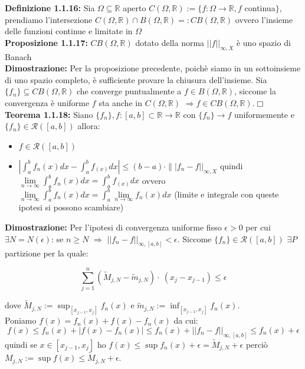 \documentclass[a4paper,11pt,titlepage]{book}
\begin{document}
\textbf{Definizione 1.1.16:} Sia $\Omega \subseteq \mathbb{R}$ aperto $C(\Omega,\mathbb{R}):=\{f:\Omega\rightarrow\mathbb{R}, f$ continua$\}$, prendiamo l'intersezione $C(\Omega,\mathbb{R})\cap B(\Omega,\mathbb{R})=:CB(\Omega,\mathbb{R})$ ovvero l'insieme delle funzioni continue e limitate in $\Omega$\\

\textbf{Proposizione 1.1.17:} $CB(\Omega,\mathbb{R})$ dotato della norma $||f||_{\infty,X}$ è uno spazio di Banach\\

\textbf{Dimostrazione:} Per la proposizione precedente, poichè siamo in un sottoinsieme di uno spazio completo, è sufficiente provare la chiusura dell'insieme. Sia $\{f_{n}\}\subseteq CB(\Omega,\mathbb{R})$ che converge puntualmente a $f\in B(\Omega,\mathbb{R})$, siccome la convergenza è uniforme $f$ sta anche in $C(\Omega,\mathbb{R})$ $\Rightarrow f \in CB(\Omega,\mathbb{R})$.$\Box$\\

\textbf{Teorema 1.1.18:} Siano $\{f_{n}\},f:[a,b]\subset\mathbb{R}\rightarrow\mathbb{R}$ con $\{f_{n}\}\rightarrow f$ uniformemente e  $\{f_{n}\}\in\mathcal{R}([a,b])$ allora:
\begin{itemize}
\item $f\in \mathcal{R}([a,b])$
\item $|\int_{a}^{b}f_{n}(x)dx-\int_{a}^{b}f_(x)dx|\leq (b-a)\cdot\||f_{n}-f||_{\infty,X}$ quindi $\lim\limits_{n \to \infty}\int_{a}^{b}f_{n}(x)dx=\int_{a}^{b}f_(x)dx$ ovvero $\lim\limits_{n \to \infty}\int_{a}^{b}f_{n}(x)dx=\int_{a}^{b}\lim\limits_{n \to \infty}{f_{n}(x)}dx$ (limite e integrale con queste ipotesi si possono scambiare) \\
\end{itemize}

\textbf{Dimostrazione:} Per l'ipotesi di convergenza uniforme fisso $\epsilon >0$ per cui $\exists{N}=N(\epsilon)$: se $n\geq{N}$ $\Rightarrow$ $||f_{n}-f||_{\infty,[a,b]}<\epsilon$. Siccome $\{f_{n}\}\in\mathcal{R}([a,b])$ $\exists P$ partizione per la quale:


 $$\sum_{j=1}^n (\widetilde{M}_{j,N}-\widetilde{m}_{j,N})\cdot\ (x_{j}-x_{j-1})\leq\epsilon$$

 dove $\widetilde{M}_{j,N}:=\sup_{[x_{j-1},x_{j}]}f_{n}(x)$ e $\widetilde{m}_{j,N}:=\inf_{[x_{j-1},x_{j}]}f_{n}(x)$. \\
 
 Poniamo $f(x)=f_{n}(x)+f(x)-f_{n}(x)$ da cui: $$f(x)\leq f_{n}(x)+|f(x)-f_{n}(x)|\leq f_{n}(x)+||f_{n}-f||_{\infty,[a,b]}\leq f_{n}(x)+\epsilon$$ quindi se $x\in [x_{j-1},x_{j}] $ ho $f(x) \leq \sup f_{n}(x)+\epsilon=\widetilde{M}_{j,N}+\epsilon$ perciò $M_{j,N}:=\sup f(x)\leq\widetilde{M}_{j,N}+\epsilon$.\\
\end{document}
